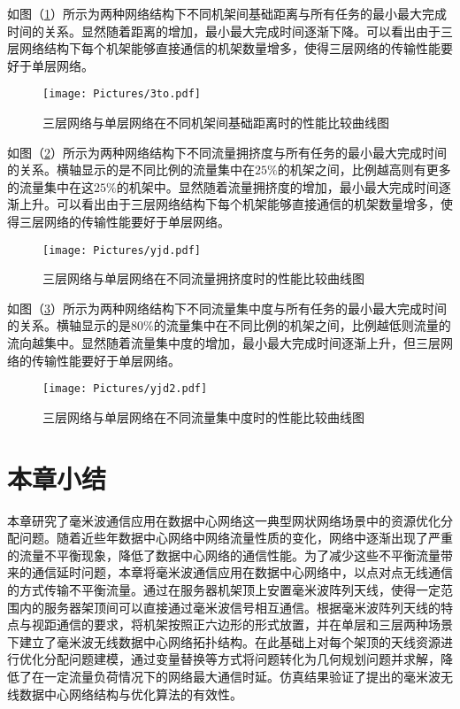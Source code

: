 如图（\ref{fig:3to}）所示为两种网络结构下不同机架间基础距离与所有任务的最小最大完成时间的关系。显然随着距离的增加，最小最大完成时间逐渐下降。可以看出由于三层网络结构下每个机架能够直接通信的机架数量增多，使得三层网络的传输性能要好于单层网络。

\begin{figure}[htbp]
	\centering
	\texttt{[image: Pictures/3to.pdf]}
	\caption{三层网络与单层网络在不同机架间基础距离时的性能比较曲线图}
	\label{fig:3to}
\end{figure}


如图（\ref{fig:yjd}）所示为两种网络结构下不同流量拥挤度与所有任务的最小最大完成时间的关系。横轴显示的是不同比例的流量集中在$25\%$的机架之间，比例越高则有更多的流量集中在这$25\%$的机架中。显然随着流量拥挤度的增加，最小最大完成时间逐渐上升。可以看出由于三层网络结构下每个机架能够直接通信的机架数量增多，使得三层网络的传输性能要好于单层网络。

\begin{figure}[htbp]
	\centering
	\texttt{[image: Pictures/yjd.pdf]}
	\caption{三层网络与单层网络在不同流量拥挤度时的性能比较曲线图}
	\label{fig:yjd}
\end{figure}

如图（\ref{fig:yjd2}）所示为两种网络结构下不同流量集中度与所有任务的最小最大完成时间的关系。横轴显示的是$80\%$的流量集中在不同比例的机架之间，比例越低则流量的流向越集中。显然随着流量集中度的增加，最小最大完成时间逐渐上升，但三层网络的传输性能要好于单层网络。

\begin{figure}[htbp]
	\centering
	\texttt{[image: Pictures/yjd2.pdf]}
	\caption{三层网络与单层网络在不同流量集中度时的性能比较曲线图}
	\label{fig:yjd2}
\end{figure}

\section{本章小结}
本章研究了毫米波通信应用在数据中心网络这一典型网状网络场景中的资源优化分配问题。随着近些年数据中心网络中网络流量性质的变化，网络中逐渐出现了严重的流量不平衡现象，降低了数据中心网络的通信性能。为了减少这些不平衡流量带来的通信延时问题，本章将毫米波通信应用在数据中心网络中，以点对点无线通信的方式传输不平衡流量。通过在服务器机架顶上安置毫米波阵列天线，使得一定范围内的服务器架顶间可以直接通过毫米波信号相互通信。根据毫米波阵列天线的特点与视距通信的要求，将机架按照正六边形的形式放置，并在单层和三层两种场景下建立了毫米波无线数据中心网络拓扑结构。在此基础上对每个架顶的天线资源进行优化分配问题建模，通过变量替换等方式将问题转化为几何规划问题并求解，降低了在一定流量负荷情况下的网络最大通信时延。仿真结果验证了提出的毫米波无线数据中心网络结构与优化算法的有效性。

